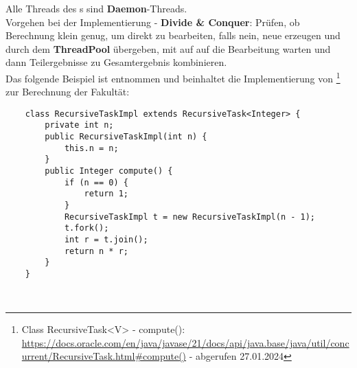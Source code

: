 \noindent
Alle Threads des s sind \textbf{Daemon}-Threads.\\

\noindent
Vorgehen bei der Implementierung - \textbf{Divide \& Conquer}: Prüfen, ob Berechnung klein genug, um direkt zu bearbeiten, falls nein, neue  erzeugen und durch  dem \textbf{ThreadPool} übergeben, mit  auf auf die Bearbeitung warten und dann Teilergebnisse zu Gesamtergebnis kombinieren.\\

\noindent
Das folgende Beispiel ist \cite[168, Listing 3.25]{Oec22} entnommen und beinhaltet die Implementierung von \footnote{
    Class RecursiveTask<V> - compute(): \url{https://docs.oracle.com/en/java/javase/21/docs/api/java.base/java/util/concurrent/RecursiveTask.html#compute()} - abgerufen 27.01.2024
} zur Berechnung der Fakultät:
\begin{verbatim}
    class RecursiveTaskImpl extends RecursiveTask<Integer> {
        private int n;
        public RecursiveTaskImpl(int n) {
            this.n = n;
        }
        public Integer compute() {
            if (n == 0) {
                return 1;
            }
            RecursiveTaskImpl t = new RecursiveTaskImpl(n - 1);
            t.fork();
            int r = t.join();
            return n * r;
        }
    }
\end{verbatim}\\